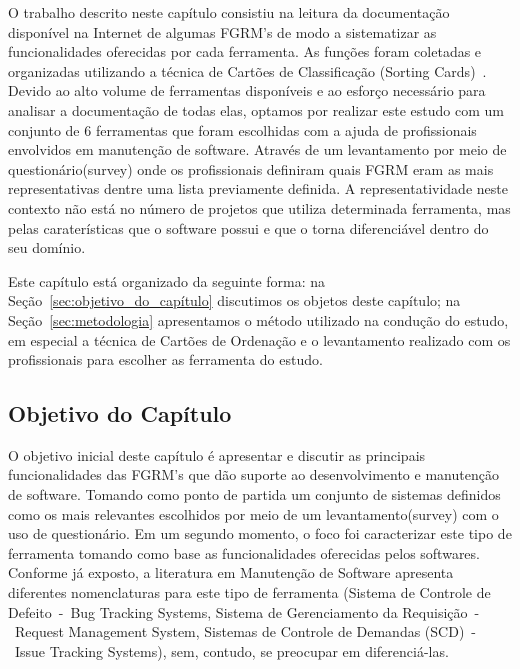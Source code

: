 O trabalho descrito neste capítulo consistiu na leitura da documentação
disponível na Internet de algumas FGRM's de modo a sistematizar as
funcionalidades o\-fe\-re\-ci\-das por cada ferramenta. As funções foram
coletadas e organizadas utilizando a técnica de Cartões de Classificação
(Sorting Cards)~\cite{5070993, rugg2005sorting}. Devido ao alto volume de
ferramentas disponíveis e ao esforço necessário para analisar a documentação de
todas elas, optamos por realizar este estudo com um conjunto de 6 ferramentas
que foram escolhidas com a ajuda de profissionais envolvidos em manutenção de
software. Através de um levantamento por meio de questionário(survey) onde os
profissionais definiram quais FGRM eram as mais representativas dentre uma lista
previamente definida. A representatividade neste contexto não está no número de
projetos que utiliza determinada ferramenta, mas pelas caraterísticas que o
software possui e que o torna diferenciável dentro do seu domínio.

Este capítulo está organizado da seguinte forma: na
Seção~\ref{sec:objetivo_do_capítulo} discutimos os objetos deste capítulo; na
Seção~\ref{sec:metodologia} apresentamos o método utilizado na condução do
estudo, em especial a técnica de Cartões de Ordenação e o levantamento realizado
com os profissionais para escolher as ferramenta do estudo.
\todoend

\subsection{Objetivo do Capítulo}
\label{subsec:caracterizacao_objetivo_do_capitulo}

O objetivo inicial deste capítulo é apresentar e discutir as principais
funcionalidades das FGRM's que dão suporte ao desenvolvimento e manutenção de
software. Tomando como ponto de partida um conjunto de sistemas definidos como
os mais relevantes escolhidos por meio de um levantamento(survey) com o uso de
questionário. Em um segundo momento, o foco foi caracterizar este tipo de
ferramenta tomando como base as funcionalidades oferecidas pelos softwares.
Conforme já exposto, a literatura em Manutenção de Software apresenta diferentes
nomenclaturas para este tipo de ferramenta (Sistema de Controle de Defeito~-~Bug
Tracking Systems, Sistema de Gerenciamento da Requisição~-~Request Management
System, Sistemas de Controle de Demandas (SCD)~-~Issue Tracking Systems), sem,
contudo, se preocupar em diferenciá-las.

